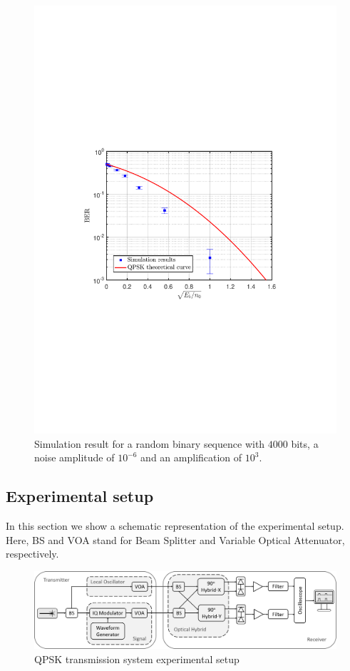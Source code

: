 \begin{figure}[h]
	\centering
	\includegraphics[clip, trim=0.5cm 9cm 0.5cm 9cm, width=\textwidth]{./sdf/m_qam_system/figures/BER_QPSK_sim_pseudorandom7_Eb_n0.pdf}
	\caption{Simulation result for a random binary sequence with $4000$ bits, a noise amplitude of $10^{-6}$ and an amplification of $10^3$.}
	\label{fig:ber_pseudorandom}
\end{figure}%

\subsection{Experimental setup}

In this section we show a schematic representation of the experimental setup. Here, BS and VOA stand for Beam Splitter and Variable Optical Attenuator, respectively.

\begin{figure}[h]
	\centering
	\includegraphics[width=\textwidth]{./sdf/m_qam_system/figures/experimental_setup.png}
	\caption{QPSK transmission system experimental setup}
	\label{fig:exp}
\end{figure}%